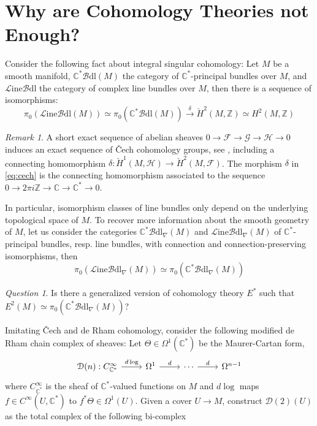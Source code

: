 \documentclass[a4paper]{book}
\newcommand{\lB}{\mathcal{B}}
\newcommand{\bC}{\mathbb{C}}
\newcommand{\lD}{\mathcal{D}}
\newcommand{\lF}{\mathcal{F}}
\newcommand{\lG}{\mathcal{G}}
\newcommand{\lH}{\mathcal{H}}
\newcommand{\lL}{\mathcal{L}}
\newcommand{\bZ}{\mathbb{Z}}
\newcommand{\Bdl}{\lB\mathrm{dl}} %
\renewcommand{\Line}{\lL\mathrm{ine}} %
\newcommand{\LineBdl}{\Line\Bdl} %
\theoremstyle{definition}
\theoremstyle{remark}
\newtheorem{remark}[equation]{Remark}
\newtheorem{question}[equation]{Question}
\numberwithin{equation}{section}
\begin{document}
\section{Why are Cohomology Theories not Enough?}
Consider the following fact about integral singular cohomology: Let $M$ be a smooth manifold, $\bC^*\Bdl(M)$ the category of $\bC^*$-principal bundles over $M$, and $\LineBdl$ the category of complex line bundles over $M$, then there is a sequence of isomorphisms:
\begin{equation}\label{eq:cech}
	\pi_0(\LineBdl(M))\simeq\pi_0(\bC^*\Bdl(M))\xrightarrow{\delta}\check{H}^2(M,\bZ)\simeq H^2(M,\bZ)
\end{equation}
\begin{remark}
	A short exact sequence of abelian sheaves $0\to\lF\to\lG\to\lH\to 0$ induces an exact sequence of \v Cech cohomology groups, see \cite{project2026cechsing}, including a connecting homomorphism $\delta:\check{H}^1(M,\lH)\to\check{H}^2(M,\lF)$. The morphism $\delta$ in \cref{eq:cech} is the connecting homomorphism associated to the sequence $0\to2\pi i\bZ\to\bC\to\bC^*\to0$. 
\end{remark}
In particular, isomorphism classes of line bundles only depend on the underlying topological space of $M$. To recover more information about the smooth geometry of $M$, let us consider the categories $\bC^*\Bdl_\nabla(M)$ and $\LineBdl_\nabla(M)$ of $\bC^*$-principal bundles, resp. line bundles, with connection and connection-preserving isomorphisms, then 
\[\pi_0(\LineBdl_\nabla(M))\simeq\pi_0(\bC^*\Bdl_\nabla(M))\]
\begin{question}
Is there a generalized version of cohomology theory $E^*$ such that $E^2(M)\simeq\pi_0(\bC^*\Bdl_\nabla(M))$? 
\end{question}
Imitating \v Cech and de Rham cohomology, consider the following modified de Rham chain complex of sheaves: Let $\Theta\in\Omega^1(\bC^*)$ be the Maurer-Cartan form, 
\begin{equation}\label{eq:delignecomp}
	\begin{tikzcd}
		\lD(n):C^\infty_{\bC^*}\arrow[r," d\log"] & \Omega^1 \arrow[r," d"] & \cdots \arrow[r," d"] & \Omega^{n-1}
	\end{tikzcd}
\end{equation}where $C^\infty_{\bC^*}$ is the sheaf of $\bC^*$-valued functions on $M$ and $ d\log$ maps $f\in C^{\infty}(U,\bC^*)$ to $f^*\Theta\in\Omega^1(U)$. Given a cover $U\to M$, construct $\lD(2)(U)$ as the total complex of the following bi-complex 
\end{document}
